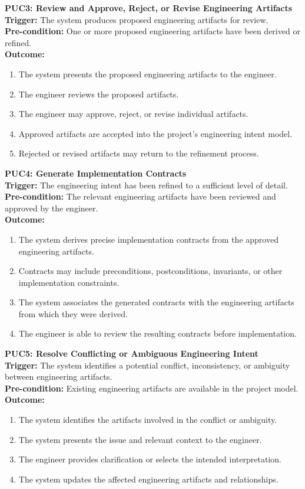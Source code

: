 \documentclass[12pt]{article}
\begin{document}
\noindent\textbf{PUC3: Review and Approve, Reject, or Revise Engineering Artifacts}\\
\textbf{Trigger:} The system produces proposed engineering artifacts for review.\\
\textbf{Pre-condition:} One or more proposed engineering artifacts have been derived or refined.\\
\textbf{Outcome:}
\begin{enumerate}
    \item The system presents the proposed engineering artifacts to the engineer.
    \item The engineer reviews the proposed artifacts.
    \item The engineer may approve, reject, or revise individual artifacts.
    \item Approved artifacts are accepted into the project's engineering intent model.
    \item Rejected or revised artifacts may return to the refinement process.
\end{enumerate}

\noindent\textbf{PUC4: Generate Implementation Contracts}\\
\textbf{Trigger:} The engineering intent has been refined to a sufficient level of detail.\\
\textbf{Pre-condition:} The relevant engineering artifacts have been reviewed and approved by the engineer.\\
\textbf{Outcome:}
\begin{enumerate}
    \item The system derives precise implementation contracts from the approved engineering artifacts.
    \item Contracts may include preconditions, postconditions, invariants, or other implementation constraints.
    \item The system associates the generated contracts with the engineering artifacts from which they were derived.
    \item The engineer is able to review the resulting contracts before implementation.
\end{enumerate}

\noindent\textbf{PUC5: Resolve Conflicting or Ambiguous Engineering Intent}\\
\textbf{Trigger:} The system identifies a potential conflict, inconsistency, or ambiguity between engineering artifacts.\\
\textbf{Pre-condition:} Existing engineering artifacts are available in the project model.\\
\textbf{Outcome:}
\begin{enumerate}
    \item The system identifies the artifacts involved in the conflict or ambiguity.
    \item The system presents the issue and relevant context to the engineer.
    \item The engineer provides clarification or selects the intended interpretation.
    \item The system updates the affected engineering artifacts and relationships.
\end{enumerate}
\end{document}
